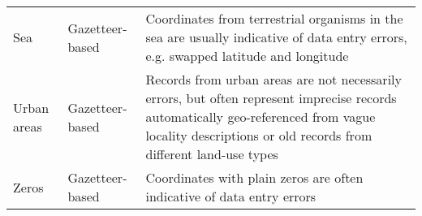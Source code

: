 \documentclass[
  12pt,
]{article}
\begin{document}
\begin{table}[!h]
\begin{tabular}[t]{>{\raggedright\arraybackslash}p{2cm}>{\raggedright\arraybackslash}p{2.5cm}>{\raggedright\arraybackslash}p{10cm}}
\addlinespace
\rowcolor{gray!6}  Sea & Gazetteer-based & Coordinates from terrestrial organisms in the sea are usually indicative of data entry errors, e.g. swapped latitude and longitude\\
Urban areas & Gazetteer-based & Records from urban areas are not necessarily errors, but often represent imprecise records automatically geo-referenced from vague locality descriptions or old records from different land-use types\\
\rowcolor{gray!6}  Zeros & Gazetteer-based & Coordinates with plain zeros are often indicative of data entry errors\\
\bottomrule
\end{tabular}
\end{table}

\begin{landscape}\begin{table}


\end{table}
\end{landscape}
\end{document}
